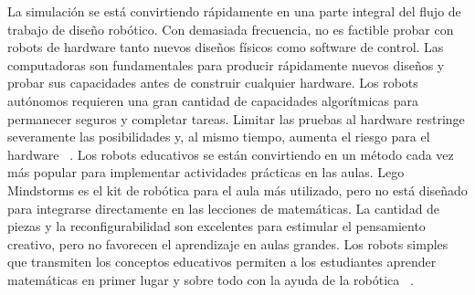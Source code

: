 La simulación se está convirtiendo rápidamente en una parte integral del flujo de trabajo de diseño robótico. Con demasiada frecuencia, no es factible probar con robots de hardware tanto nuevos diseños físicos como software de control. Las computadoras son fundamentales para producir rápidamente nuevos diseños y probar sus capacidades antes de construir cualquier hardware. Los robots autónomos requieren una gran cantidad de capacidades algorítmicas para permanecer seguros y completar tareas. Limitar las pruebas al hardware restringe severamente las posibilidades y, al mismo tiempo, aumenta el riesgo para el hardware ~\cite{gucwa cheng}.
Los robots educativos se están convirtiendo en un método cada vez más popular para implementar actividades prácticas en las aulas. Lego Mindstorms es el kit de robótica para el aula más utilizado, pero no está diseñado para integrarse directamente en las lecciones de matemáticas. La cantidad de piezas y la reconfigurabilidad son excelentes para estimular el pensamiento creativo, pero no favorecen el aprendizaje en aulas grandes. Los robots simples que transmiten los conceptos educativos permiten a los estudiantes aprender matemáticas en primer lugar y sobre todo con la ayuda de la robótica ~\cite{gucwa cheng}.
